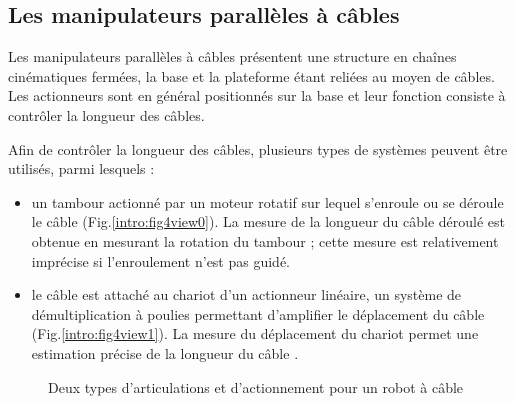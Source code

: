 \subsection{Les manipulateurs parallèles à câbles}

Les manipulateurs parallèles à câbles présentent une structure en chaînes cinéma\-tiques fermées, la base et la plateforme étant reliées au moyen de câbles. Les actionneurs sont en général positionnés sur la base et leur fonction consiste à contrôler la longueur des câbles.

Afin de contrôler la longueur des câbles, plusieurs types de systèmes peuvent être utilisés, parmi lesquels :
\begin{itemize}
 \item un tambour actionné par un moteur rotatif sur lequel s'enroule ou se déroule le câble (Fig.\ref{intro:fig4view0}). La mesure de la longueur du câble déroulé est obtenue en mesurant la rotation du tambour ; cette mesure est relativement imprécise si l'enroulement n'est pas guidé.
 \item le câble est attaché au chariot d'un actionneur linéaire, un système de démultiplication à poulies permettant d'amplifier le déplacement du câble (Fig.\ref{intro:fig4view1}). La mesure du déplacement du chariot permet une estimation précise de la longueur du câble \cite{merlet2008}. 
\end{itemize}

\begin{figure}[!ht]
  \centering
       \hfill
    \caption{\footnotesize Deux types d'articulations et d'actionnement pour un robot à câble}
\label{intro:fig4}
\end{figure}

